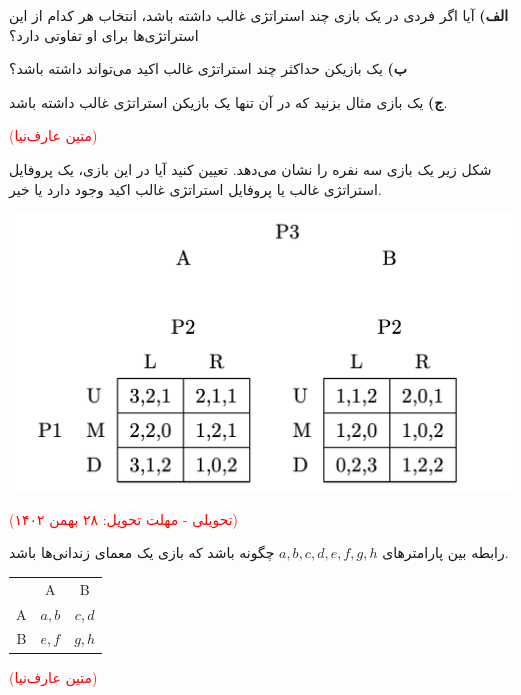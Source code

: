 \documentclass[11pt,a4paper]{article}
\begin{document}




\textbf{الف)}
آیا اگر فردی در یک بازی چند استراتژی غالب داشته باشد، انتخاب هر کدام از این استراتژی‌ها برای او تفاوتی دارد؟ 

\textbf{ب)}
یک بازیکن حداکثر چند استراتژی غالب اکید می‌تواند داشته باشد؟

\textbf{ج)}
یک بازی مثال بزنید که در آن تنها یک بازیکن استراتژی غالب داشته باشد. 

\vspace{0.5em}
\textcolor{red}{(متین عارف‌نیا)}



شکل زیر یک بازی سه نفره را نشان می‌دهد. تعیین کنید آیا در این بازی، یک پروفایل استراتژی غالب یا پروفایل استراتژی غالب اکید وجود دارد یا خیر.

	{\begin{center}\includegraphics[width=0.5\linewidth]{pics/DSE}\end{center}}

\vspace{0.5em}
\textcolor{red}{(تحویلی - مهلت تحویل: ۲۸ بهمن ۱۴۰۲)}




رابطه بین پارامترهای $a,b,c,d,e,f,g,h$ چگونه باشد که 
بازی یک معمای زندانی‌ها باشد.

\begin{latin}
	\begin{center}
		\begin{tabular}{ r|c|c| }
			\multicolumn{1}{r}{}
			&  \multicolumn{1}{c}{A}
			& \multicolumn{1}{c}{B} \\
			\cline{2-3}
			A & $a,b$ & $c,d$ \\
			\cline{2-3}
			B & $e,f$ & $g,h$ \\
			\cline{2-3}
		\end{tabular}
	\end{center}
\end{latin}
\vspace{-1.5em}
\textcolor{red}{(متین عارف‌نیا)}
\end{document}
